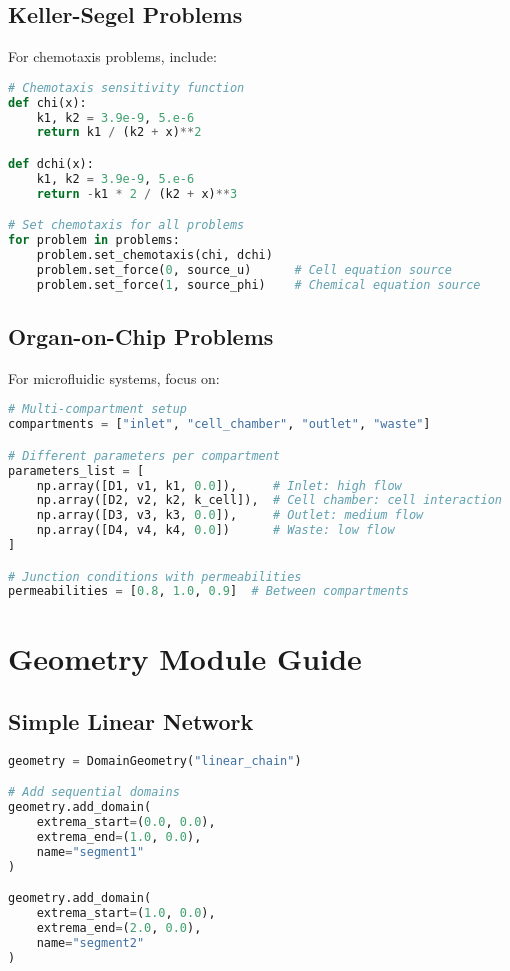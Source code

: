 \documentclass[11pt,a4paper]{article}
\begin{document}
\subsection{Keller-Segel Problems}

For chemotaxis problems, include:

\begin{lstlisting}[language=Python, caption={Keller-Segel Problem Setup}]
# Chemotaxis sensitivity function
def chi(x):
    k1, k2 = 3.9e-9, 5.e-6
    return k1 / (k2 + x)**2

def dchi(x):
    k1, k2 = 3.9e-9, 5.e-6
    return -k1 * 2 / (k2 + x)**3

# Set chemotaxis for all problems
for problem in problems:
    problem.set_chemotaxis(chi, dchi)
    problem.set_force(0, source_u)      # Cell equation source
    problem.set_force(1, source_phi)    # Chemical equation source
\end{lstlisting}

\subsection{Organ-on-Chip Problems}

For microfluidic systems, focus on:

\begin{lstlisting}[language=Python, caption={Organ-on-Chip Problem Setup}]
# Multi-compartment setup
compartments = ["inlet", "cell_chamber", "outlet", "waste"]

# Different parameters per compartment
parameters_list = [
    np.array([D1, v1, k1, 0.0]),     # Inlet: high flow
    np.array([D2, v2, k2, k_cell]),  # Cell chamber: cell interaction
    np.array([D3, v3, k3, 0.0]),     # Outlet: medium flow
    np.array([D4, v4, k4, 0.0])      # Waste: low flow
]

# Junction conditions with permeabilities
permeabilities = [0.8, 1.0, 0.9]  # Between compartments
\end{lstlisting}

\section{Geometry Module Guide}

\subsection{Simple Linear Network}

\begin{lstlisting}[language=Python, caption={Linear Network Geometry}]
geometry = DomainGeometry("linear_chain")

# Add sequential domains
geometry.add_domain(
    extrema_start=(0.0, 0.0),
    extrema_end=(1.0, 0.0),
    name="segment1"
)

geometry.add_domain(
    extrema_start=(1.0, 0.0),
    extrema_end=(2.0, 0.0),
    name="segment2"
)
\end{lstlisting}
\end{document}
